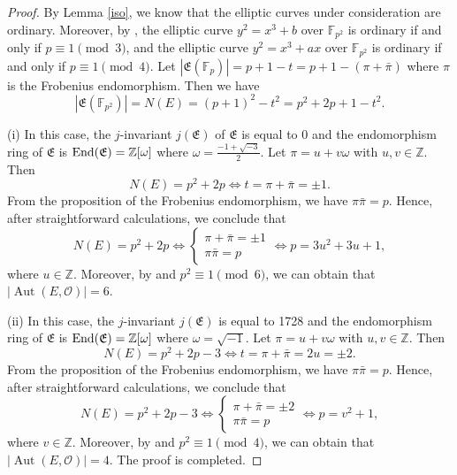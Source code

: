 \documentclass[journal,12pt,onecolumn]{IEEEtran}
\begin{document}
\begin{proof}
    By Lemma \ref{iso}, we know that the elliptic curves under consideration are ordinary. Moreover, by \cite[Prop. 4.37]{washington_elliptic_2008}, the elliptic curve \( y^2 = x^3 + b \) over \( \mathbb{F}_{p^2} \) is ordinary if and only if \( p \equiv 1 \pmod{3} \), and the elliptic curve \( y^2 = x^3 + ax \) over \( \mathbb{F}_{p^2} \) is ordinary if and only if \( p \equiv 1 \pmod{4} \). Let \(|\mathfrak{E}(\mathbb{F}_p)| = p + 1 - t = p + 1 - (\pi + \bar{\pi})\) where \(\pi\) is the Frobenius endomorphism. Then we have 
    \[
        |\mathfrak{E}(\mathbb{F}_{p^2})| = N(E) = (p + 1)^2 - t^2 = p^2 + 2p + 1 - t^2.
    \]
    
    (i) In this case, the $j$-invariant \(j(\mathfrak{E})\) of \( \mathfrak{E} \) is equal to 0 and the endomorphism ring of \( \mathfrak{E} \) is \({\rm End}(\mathfrak{E}) = \mathbb{Z}[\omega]\) where \(\omega = \frac{-1 + \sqrt{-3}}{2}\). Let \( \pi = u + v\omega\) with \( u,v\in\mathbb{Z} \). Then
    \[
        N(E) = p^2 + 2p \Longleftrightarrow t = \pi + \bar{\pi} = \pm 1.
    \]
    From the proposition of the Frobenius endomorphism, we have \( \pi\bar{\pi} = p \). Hence, after straightforward calculations, we conclude that
    \[
        N(E) = p^2 + 2p \Longleftrightarrow \begin{cases}
            \pi + \bar{\pi} = \pm 1\\
            \pi\bar{\pi} = p
        \end{cases} \Longleftrightarrow p = 3u^2 + 3u + 1,
    \]
    where \(u\in\mathbb{Z}\). Moreover, by \cite[Thm. III.10.1]{silvermanArithmeticEllipticCurves2009} and \( p^2 \equiv 1 \pmod{6} \), we can obtain that \(|\operatorname{Aut}(E, \mathcal{O})| = 6\). 

    (ii) In this case, the $j$-invariant \(j(\mathfrak{E})\) is equal to 1728 and the endomorphism ring of \( \mathfrak{E} \) is \({\rm End}(\mathfrak{E}) = \mathbb{Z}[\omega]\) where \(\omega = \sqrt{-1}\). Let \( \pi = u + v\omega\) with \( u,v\in\mathbb{Z} \). Then
    \[
        N(E) = p^2 + 2p - 3 \Longleftrightarrow t = \pi + \bar{\pi} = 2u = \pm 2.
    \]
    From the proposition of the Frobenius endomorphism, we have \( \pi\bar{\pi} = p \). Hence, after straightforward calculations, we conclude that
    \[
        N(E) = p^2 + 2p - 3 \Longleftrightarrow \begin{cases}
            \pi + \bar{\pi} = \pm 2\\
            \pi\bar{\pi} = p
        \end{cases} \Longleftrightarrow p = v^2 + 1,
    \]
    where \(v\in\mathbb{Z}\). Moreover, by \cite[Thm. III.10.1]{silvermanArithmeticEllipticCurves2009} and \( p^2 \equiv 1 \pmod{4} \), we can obtain that \(|\operatorname{Aut}(E, \mathcal{O})| = 4\).     The proof is completed.
\end{proof}
\end{document}
